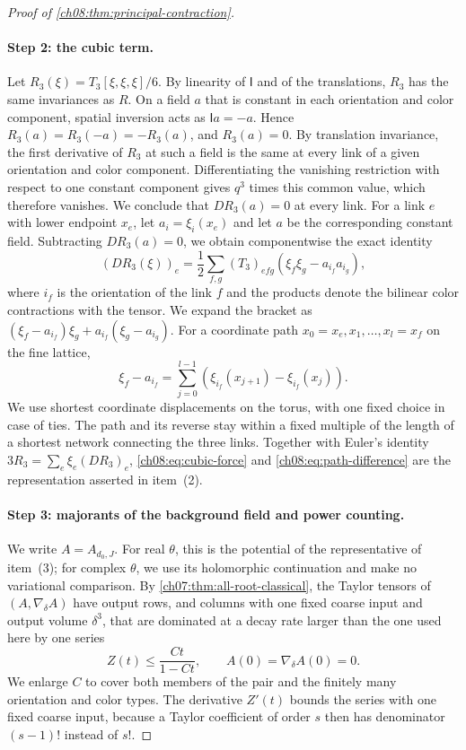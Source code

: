 \begin{proof}[Proof of \cref{ch08:thm:principal-contraction}]
\paragraph{Step 2: the cubic term.}
Let $R_3(\xi)=T_3[\xi,\xi,\xi]/6$. By linearity of $\mathsf I$ and of the translations, $R_3$ has the same invariances as $R$. On a field $a$ that is constant in each orientation and color component, spatial inversion acts as $\mathsf Ia=-a$. Hence $R_3(a)=R_3(-a)=-R_3(a)$, and $R_3(a)=0$. By translation invariance, the first derivative of $R_3$ at such a field is the same at every link of a given orientation and color component. Differentiating the vanishing restriction with respect to one constant component gives $q^3$ times this common value, which therefore vanishes. We conclude that $DR_3(a)=0$ at every link. For a link $e$ with lower endpoint $x_e$, let $a_i=\xi_i(x_e)$ and let $a$ be the corresponding constant field. Subtracting $DR_3(a)=0$, we obtain componentwise the exact identity
\begin{equation}\label{ch08:eq:cubic-force}
 (DR_3(\xi))_e=\frac12\sum_{f,g}(T_3)_{efg}
                           (\xi_f\xi_g-a_{i_f}a_{i_g}),
\end{equation}
where $i_f$ is the orientation of the link $f$ and the products denote the bilinear color contractions with the tensor. We expand the bracket as $(\xi_f-a_{i_f})\xi_g+a_{i_f}(\xi_g-a_{i_g})$. For a coordinate path $x_0=x_e,x_1,\dots,x_l=x_f$ on the fine lattice,
\begin{equation}\label{ch08:eq:path-difference}
 \xi_f-a_{i_f}=\sum_{j=0}^{l-1}
              (\xi_{i_f}(x_{j+1})-\xi_{i_f}(x_j)).
\end{equation}
We use shortest coordinate displacements on the torus, with one fixed choice in case of ties. The path and its reverse stay within a fixed multiple of the length of a shortest network connecting the three links. Together with Euler's identity $3R_3=\sum_e\xi_e(DR_3)_e$, \eqref{ch08:eq:cubic-force} and \eqref{ch08:eq:path-difference} are the representation asserted in item~(2).

\paragraph{Step 3: majorants of the background field and power counting.}
We write $A=A_{d_0,J}$. For real $\theta$, this is the potential of the representative of item~(3); for complex $\theta$, we use its holomorphic continuation and make no variational comparison. By \cref{ch07:thm:all-root-classical}, the Taylor tensors of $(A,\nabla_\delta A)$ have output rows, and columns with one fixed coarse input and output volume $\delta^3$, that are dominated at a decay rate larger than the one used here by one series
\begin{equation}\label{ch08:eq:jet-series}
 Z(t)\le\frac{Ct}{1-Ct},\qquad A(0)=\nabla_\delta A(0)=0.
\end{equation}
We enlarge $C$ to cover both members of the pair and the finitely many orientation and color types. The derivative $Z'(t)$ bounds the series with one fixed coarse input, because a Taylor coefficient of order $s$ then has denominator $(s-1)!$ instead of $s!$.


\end{proof}
